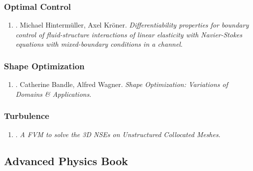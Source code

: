 \documentclass{article}
\begin{document}
\subsubsection{Optimal Control}

\begin{enumerate}
	\item \cite{Hintermueller_Kroener2023}. Michael Hinterm\"uller, Axel Kr\"oner. \textit{Differentiability properties for boundary control of fluid-structure interactions of linear elasticity with Navier-Stokes equations with mixed-boundary conditions in a channel}.\hfill{\sf[finished]}
\end{enumerate}

\subsubsection{Shape Optimization}

\begin{enumerate}
	\item \cite{Bandle_Wagner2023}. Catherine Bandle, Alfred Wagner. \textit{Shape Optimization: Variations of Domains \& Applications}.\hfill{\sf[reading]}
\end{enumerate}

\subsubsection{Turbulence}

\begin{enumerate}
	\item \cite{Perron_Boivin_Herard2004}. \textit{A FVM to solve the 3{D} NSEs on Unstructured Collocated Meshes}.\hfill{\sf[reading]}
\end{enumerate}


\subsection{Advanced Physics Book}
\end{document}
